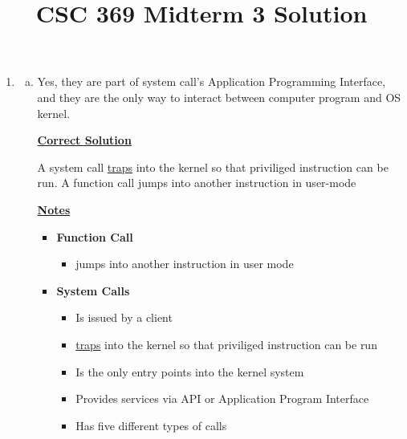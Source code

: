 \documentclass[12pt]{article}
\begin{document}
\title{CSC 369 Midterm 3 Solution}

\bigskip

\begin{enumerate}[1.]
    \item

    \begin{enumerate}[a)]

        \item
        Yes, they are part of system call's Application Programming Interface,
        and they are the only way to interact between computer program and OS kernel.
        \bigskip

        \begin{mdframed}
        \underline{\textbf{Correct Solution}}

        \bigskip

        \color{red}A system call \underline{traps} into the kernel so that priviliged
        instruction can be run. A function call jumps into another instruction in user-mode\color{black}
        \end{mdframed}

        \bigskip

        \underline{\textbf{Notes}}

        \begin{itemize}
            \item \textbf{Function Call}

            \begin{itemize}
                \item jumps into another instruction in user mode
            \end{itemize}

            \item \textbf{System Calls}
            \begin{itemize}
                \item Is issued by a client
                \item \underline{traps} into the kernel so that priviliged instruction can be run
                \item Is the only entry points into the kernel system
                \item Provides services via API or Application Program Interface
                \item Has five different types of calls


\end{itemize}
\end{itemize}
\end{enumerate}
\end{enumerate}
\end{document}
